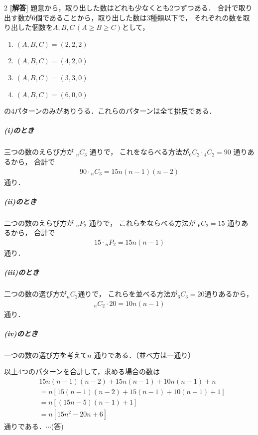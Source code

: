 \documentclass[../../main.tex]{subfiles}
\begin{document}
\setcounter{equation}{0}
\begin{oframed}
  
\end{oframed}
\setlength{\columnseprule}{0.4pt}
\begin{multicols}{2}
  {\bf [解答]}
  題意から，取り出した数はどれも少なくとも2つずつある．
  合計で取り出す数が6個であることから，取り出した数は3種類以下で，
  それぞれの数を取り出した個数を$A,B,C\, (A\ge B\ge C)$として，
  \begin{enumerate}
    \item[(i)] $(A,B,C) = (2,2,2)$
    \item[(ii)] $(A,B,C) = (4,2,0)$
    \item[(iii)] $(A,B,C) = (3,3,0)$
    \item[(iv)] $(A,B,C) = (6,0,0)$
  \end{enumerate}
  の4パターンのみがありうる．これらのパターンは全て排反である．

  \subparagraph{(i)のとき}
  三つの数のえらび方が ${}_nC_3$ 通りで，
  これをならべる方法が${}_6C_2 \cdot {}_4C_2 = 90$ 通りあるから，
  合計で
  \begin{align}
    90 \cdot {}_nC_{3} = 15n(n-1)(n-2)
  \end{align}
  通り．

  \subparagraph{(ii)のとき}
  二つの数のえらび方が ${}_nP_2$ 通りで，
  これらをならべる方法が ${}_6C_2 = 15$ 通りあるから，
  合計で
  \begin{align}
    15 \cdot {}_nP_2 = 15n(n-1)
  \end{align}
  通り．

  \subparagraph{(iii)のとき}
  二つの数の選び方が${}_nC_{2}$通りで，
  これらを並べる方法が${}_6C_{3}=20$通りあるから，
  \begin{align}
    {}_nC_2 \cdot 20 = 10n(n-1)
  \end{align}
  通り．

  \subparagraph{(iv)のとき}
  一つの数の選び方を考えて$n$ 通りである．（並べ方は一通り）

  以上4つのパターンを合計して，求める場合の数は
  \begin{align}
    & 15n(n-1)(n-2) + 15n(n-1) + 10n(n-1) + n   \\
    & = n[15(n-1)(n-2) + 15(n-1) + 10(n-1) + 1] \\
    & = n[(15n-5)(n-1) + 1]                    \\
    & = n[15n^2 - 20n + 6]
  \end{align}
  通りである．$\cdots$(答)

  \newpage
\end{multicols}
\end{document}
